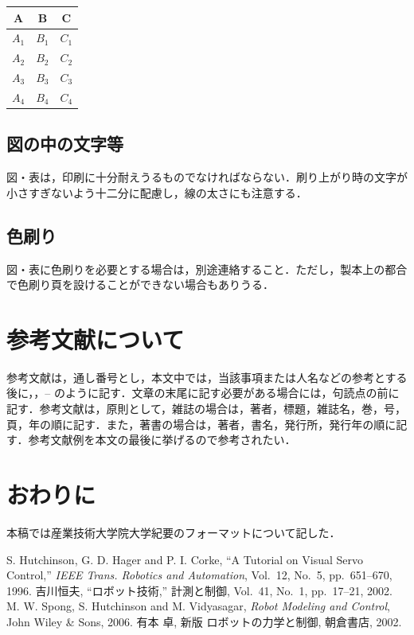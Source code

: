 \documentclass[a4j,twoside]{jarticle}
\begin{document}
\begin{multicols}{2}
\label{tab:cost2}
\begin{center}
\begin{tabular}{|c|c|c|} \hline
A & B & C \\ \hline
$A_{1}$ & $B_{1}$ & $C_{1}$ \\ \hline
$A_{2}$ & $B_{2}$ & $C_{2}$ \\ \hline
$A_{3}$ & $B_{3}$ & $C_{3}$ \\ \hline
$A_{4}$ & $B_{4}$ & $C_{4}$ \\ \hline
\end{tabular}
\end{center}

\subsection{図の中の文字等}
 図・表は，印刷に十分耐えうるものでなければならない．刷り上がり時の文字が小さすぎないよう十二分に配慮し，線の太さにも注意する．

\subsection{色刷り}
図・表に色刷りを必要とする場合は，別途連絡すること．ただし，製本上の都合で色刷り頁を設けることができない場合もありうる．

\section{参考文献について}
参考文献は，通し番号とし，本文中では，当該事項または人名などの参考とする
後に，\cite{TRA96HuHaCo}，\cite{SICE02Yo}--\cite{Asa02Ar} のように記す．文章の末尾に記す必要がある場合には，句読点の前に記す．参考文献は，原則として，雑誌の場合は，著者，標題，雑誌名，巻，号，頁，年の順に記す．また，著書の場合は，著者，書名，発行所，発行年の順に記す．参考文献例を本文の最後に挙げるので参考されたい．

\section{おわりに}
本稿では産業技術大学院大学紀要のフォーマットについて記した．



\begin{thebibliography}{99}
S. Hutchinson, G. D. Hager and P. I. Corke,
``A Tutorial on Visual Servo Control,''
{\it IEEE Trans. Robotics and Automation},
Vol.~12, No.~5, pp.~651--670, 1996.
%
吉川恒夫,
``ロボット技術,''
計測と制御, Vol.~41, No.~1, pp.~17--21, 2002.
%
M. W. Spong, S. Hutchinson and M. Vidyasagar, 
{\it Robot Modeling and Control}, 
John Wiley \& Sons, 2006. 
%
有本 卓, 新版 ロボットの力学と制御, 朝倉書店, 2002. 
\end{thebibliography}

\newpage %

\end{multicols}
\end{document}
